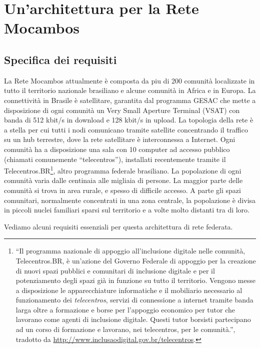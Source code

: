 
\chapter{Un'architettura per la Rete Mocambos}
\label{Capitolo3}

\section{Specifica dei requisiti}
La Rete Mocambos attualmente è composta da piu di 200 comunità
localizzate in tutto il territorio nazionale brasiliano e alcune
comunità in Africa e in Europa. La connettività in Brasile è
satellitare, garantita dal programma GESAC che mette a disposizione di
ogni comunità un Very Small Aperture Terminal (VSAT) con banda di 512
kbit/s in download e 128 kbit/s in upload. La topologia della rete è a
stella per cui tutti i nodi comunicano tramite satellite concentrando
il traffico su un hub terrestre, dove la rete satellitare è
interconnessa a Internet. Ogni comunità ha a disposizione una sala con
10 computer ad accesso pubblico (chiamati comunemente
``telecentros''), installati recentemente tramite il
Telecentros.BR\footnote{``Il programma nazionale di appoggio
  all'inclusione digitale nelle comunità, Telecentros.BR, è un'azione
  del Governo Federale di appoggio per la creazione di nuovi spazi
  pubblici e comunitari di inclusione digitale e per il potenziamento
  degli spazi già in funzione su tutto il territorio. Vengono messe a
  disposizione le apparecchiature informatiche e il mobiliario
  necessario al funzionamento dei \textit{telecentros}, servizi di
  connessione a internet tramite banda larga oltre a formazione e
  borse per l'appoggio economico per tutor che lavorano come agenti di
  inclusione digitale. Questi tutor borsisti partecipano ad un corso
  di formazione e lavorano, nei telecentros, per le comunità.'',
  tradotto da \url{http://www.inclusaodigital.gov.br/telecentros}.},
altro programma federale brasiliano. La popolazione di ogni comunità
varia dalle centinaia alle migliaia di persone. La maggior parte delle
comunità si trova in area rurale, e spesso di difficile accesso. A
parte gli spazi comunitari, normalmente concentrati in una zona
centrale, la popolazione è divisa in piccoli nuclei familiari sparsi
sul territorio e a volte molto distanti tra di loro.

Vediamo alcuni requisiti essenziali per questa architettura di rete
federata.


